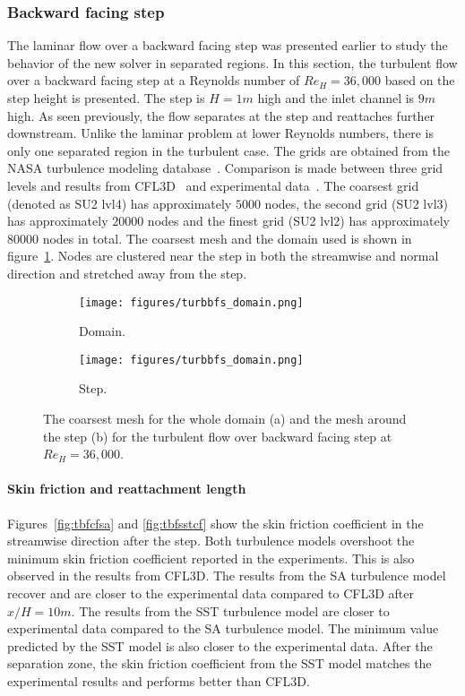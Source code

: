 \subsubsection{Backward facing step}
The laminar flow over a backward facing step was presented earlier to study the behavior of the new solver in separated regions. In this section, the turbulent flow over a backward facing step at a Reynolds number of $Re_H=36,000$ based on the step height is presented. The step is $H=1m$ high and the inlet channel is $9m$ high. As seen previously, the flow separates at the step and reattaches further downstream. Unlike the laminar problem at lower Reynolds numbers, there is only one separated region in the turbulent case. The grids are obtained from the NASA turbulence modeling database~\cite{NASATMR}. Comparison is made between three grid levels and results from CFL3D~\cite{NASATMR} and experimental data~\cite{driver1985features}. The coarsest grid (denoted as SU2 lvl4) has approximately $5000$ nodes, the second grid (SU2 lvl3) has approximately $20000$ nodes and the finest grid (SU2 lvl2) has approximately $80000$ nodes in total. The coarsest mesh and the domain used is shown in figure~\ref{fig:turbbfsdom}. Nodes are clustered near the step in both the streamwise and normal direction and stretched away from the step.
\begin{figure}[h!]
    \centering
     \begin{subfigure}[b]{0.9\textwidth}
    \centering
    \captionsetup{justification=centering}
        \texttt{[image: figures/turbbfs\_domain.png]}
        \caption{Domain.}
    \end{subfigure}
     \begin{subfigure}[b]{0.9\textwidth}
    \centering
    \captionsetup{justification=centering}
        \texttt{[image: figures/turbbfs\_domain.png]}
        \caption{Step.}
    \end{subfigure}
    \captionsetup{justification=centering}    
    \caption{The coarsest mesh for the whole domain (a) and the mesh around the step (b) for the turbulent flow over backward facing step at $Re_H=36,000$.}
     \label{fig:turbbfsdom}
\end{figure}
\paragraph*{Skin friction and reattachment length}
Figures~\ref{fig:tbfcfsa} and \ref{fig:tbfsstcf} show the skin friction coefficient in the streamwise direction after the step. Both turbulence models overshoot the minimum skin friction coefficient reported in the experiments. This is also observed in the results from CFL3D. The results from the SA turbulence model recover and are closer to the experimental data compared to CFL3D after $x/H=10m$. The results from the SST turbulence model are closer to experimental data compared to the SA turbulence model. The minimum value predicted by the SST model is also closer to the experimental data. After the separation zone, the skin friction coefficient from the SST model matches the experimental results and performs better than CFL3D.

